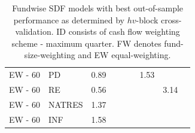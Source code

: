 \documentclass[12pt]{article}
\begin{document}
\begin{table}[ht]
\begin{tabular}{llrrrrrrl}
		EW - 60 & PD & 0.89 &  &  &  & 1.53 &  &  \\ 
		EW - 60 & RE & 0.56 &  &  &  &  & 3.14 &  \\ 
		EW - 60 & NATRES & 1.37 &  &  &  &  &  &  \\ 
		EW - 60 & INF & 1.58 &  &  &  &  &  &  \\ 
		\hline
		\hline
	\end{tabular}
	\caption{Fundwise SDF models with best out-of-sample performance as determined by $hv$-block cross-validation. ID consists of cash flow weighting scheme - maximum quarter. FW denotes fund-size-weighting and EW equal-weighting.} 
	\label{tab:result_summary}
\end{table}



\end{document}
